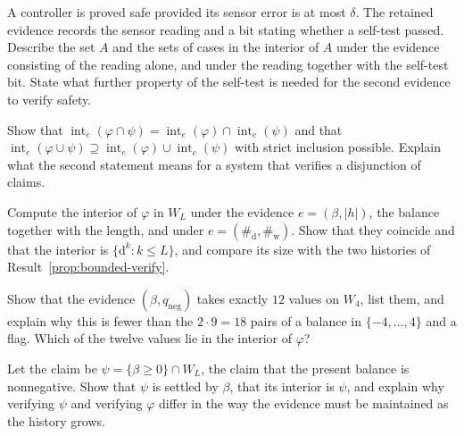 \begin{exercise}
A controller is proved safe provided its sensor error is at most $\delta$. The retained evidence records the sensor reading and a bit stating whether a self-test passed. Describe the set $A$ and the sets of cases in the interior of $A$ under the evidence consisting of the reading alone, and under the reading together with the self-test bit. State what further property of the self-test is needed for the second evidence to verify safety.
\end{exercise}

\begin{exercise}
Show that $\operatorname{int}_e(\varphi\cap\psi)=\operatorname{int}_e(\varphi)\cap\operatorname{int}_e(\psi)$ and that $\operatorname{int}_e(\varphi\cup\psi)\supseteq\operatorname{int}_e(\varphi)\cup\operatorname{int}_e(\psi)$ with strict inclusion possible. Explain what the second statement means for a system that verifies a disjunction of claims.
\end{exercise}


\begin{exercise}
Compute the interior of $\varphi$ in $W_L$ under the evidence $e=(\beta,|h|)$, the balance together with the length, and under $e=(\#_{\mathrm d},\#_{\mathrm w})$. Show that they coincide and that the interior is $\{\mathrm d^{k}:k\le L\}$, and compare its size with the two histories of Result~\ref{prop:bounded-verify}.
\end{exercise}

\begin{exercise}
Show that the evidence $(\beta,q_{\mathrm{neg}})$ takes exactly $12$ values on $W_4$, list them, and explain why this is fewer than the $2\cdot9=18$ pairs of a balance in $\{-4,\dots,4\}$ and a flag. Which of the twelve values lie in the interior of $\varphi$?\label{ex:twelve}
\end{exercise}

\begin{exercise}
Let the claim be $\psi=\{\beta\ge0\}\cap W_L$, the claim that the present balance is nonnegative. Show that $\psi$ is settled by $\beta$, that its interior is $\psi$, and explain why verifying $\psi$ and verifying $\varphi$ differ in the way the evidence must be maintained as the history grows.
\end{exercise}

